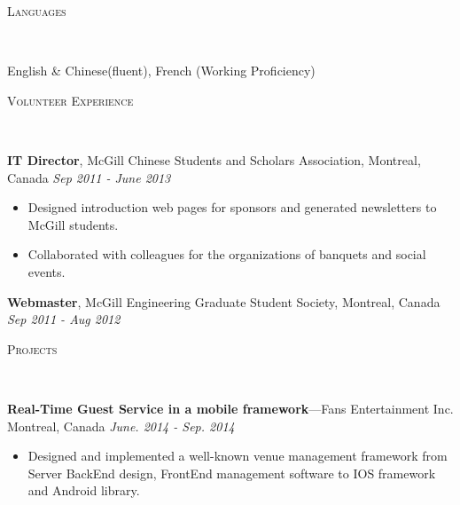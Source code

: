 \documentclass[11pt]{article}
\newenvironment{changemargin}[2]{%
  \begin{list}{}{%
    \setlength{\topsep}{0pt}%
    \setlength{\leftmargin}{#1}%
    \setlength{\rightmargin}{#2}%
    \setlength{\listparindent}{\parindent}%
    \setlength{\itemindent}{\parindent}%
    \setlength{\parsep}{\parskip}%
  }%
  \item[]}{\end{list}
}
\newcommand{\lineover}{
	\begin{changemargin}{-0.05in}{-0.05in}
		\vspace*{-8pt}
		\hrulefill \\
		\vspace*{-2pt}
	\end{changemargin}
}
\newcommand{\header}[1]{
	\begin{changemargin}{-0.5in}{-0.5in}
		\scshape{#1}\\
  	\lineover
	\end{changemargin}
}
\newenvironment{body} {
	\vspace*{-16pt}
	\begin{changemargin}{-0.25in}{-0.5in}
  }	
	{\end{changemargin}
}
\begin{document}
\header{Languages}
\begin{body}
	\vspace{14pt}
	English \& Chinese(fluent), French (Working Proficiency)\\
\end{body}
\smallskip

\header{Volunteer Experience}
\begin{body}
	\vspace{14pt}
\textbf{IT Director}, McGill Chinese Students and Scholars Association, Montreal, Canada \hfill{} \emph{Sep 2011 - June 2013}\\
\begin{itemize}
	\item Designed introduction web pages for sponsors and generated newsletters to McGill students.
	\item Collaborated with colleagues for the organizations of banquets and social events.
\end{itemize}
\smallskip
	\textbf{Webmaster}, McGill Engineering Graduate Student Society, Montreal, Canada \hfill{}  \emph{Sep 2011 - Aug 2012}\\
\smallskip
\end{body}
\smallskip
\header{Projects}
\begin{body}
	\vspace{14pt}
	\textbf{Real-Time Guest Service in a mobile framework}---Fans Entertainment Inc. Montreal, Canada  \hfill \emph{June. 2014 - Sep. 2014}\\
	\begin{itemize} \itemsep -0pt  %
		\item Designed and implemented a well-known venue management framework from Server BackEnd design, FrontEnd management software to IOS framework and Android library.
	\end{itemize}
\end{body}
\end{document}
